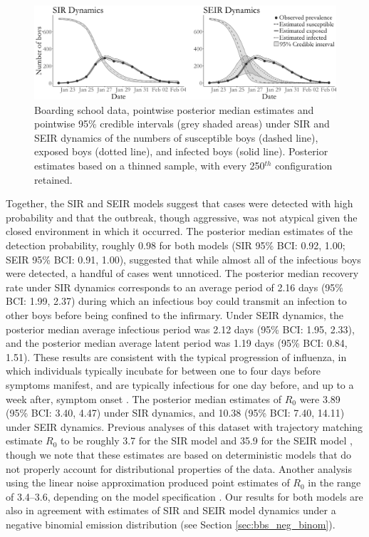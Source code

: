 \begin{figure}[ht!]
	\centering
	\includegraphics[width=\linewidth]{figures/bbs_latent_posts.pdf}
	\caption[Boarding school data and latent posterior under SIR and SEIR dynamics.]{Boarding school data, pointwise posterior median estimates and pointwise 95\% credible intervals (grey shaded areas) under SIR and SEIR dynamics of the numbers of susceptible boys (dashed line), exposed boys (dotted line), and infected boys (solid line). Posterior estimates based on a thinned sample, with every 250$ ^{th} $ configuration retained.}
	\label{fig:bbs_dat}
\end{figure}

Together, the SIR and SEIR models suggest that cases were detected with high probability and that the outbreak, though aggressive, was not atypical given the closed environment in which it occurred. The posterior median estimates of the detection probability, roughly 0.98 for both models (SIR 95\% BCI: 0.92, 1.00; SEIR 95\% BCI: 0.91, 1.00), suggested that while almost all of the infectious boys were detected, a handful of cases went unnoticed. The posterior median recovery rate under SIR dynamics corresponds to an average period of 2.16 days (95\% BCI: 1.99, 2.37) during which an infectious boy could transmit an infection to other boys before being confined to the infirmary. Under SEIR dynamics, the posterior median average infectious period was 2.12 days (95\% BCI: 1.95, 2.33), and the posterior median average latent period was 1.19 days (95\% BCI: 0.84, 1.51). These results are consistent with the typical progression of influenza, in which individuals typically incubate for between one to four days before symptoms manifest, and are typically infectious for one day before, and up to a week after, symptom onset \cite{cdcFlu}. The posterior median estimates of $ R_0 $ were 3.89 (95\% BCI: 3.40, 4.47) under SIR dynamics, and 10.38 (95\% BCI: 7.40, 14.11) under SEIR dynamics. Previous analyses of this dataset with trajectory matching estimate $ R_0 $ to be roughly 3.7 for the SIR model and 35.9 for the SEIR model \cite{wearing2005, keeling2008}, though we note that these estimates are based on deterministic models that do not properly account for distributional properties of the data. Another analysis using the linear noise approximation produced point estimates of $ R_0 $ in the range of 3.4--3.6, depending on the model specification \cite{ross2009parameter}. Our results for both models are also in agreement with estimates of SIR and SEIR model dynamics under a negative binomial emission distribution (see Section \ref{sec:bbs_neg_binom}).


